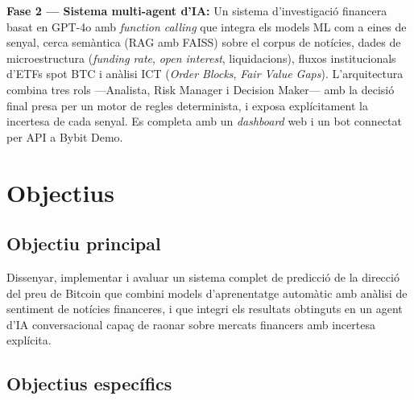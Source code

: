 \documentclass[12pt, a4paper]{report}
\begin{document}
\textbf{Fase 2 --- Sistema multi-agent d'IA:} Un sistema d'investigació financera basat en GPT-4o amb \textit{function calling} que integra els models ML com a eines de senyal, cerca semàntica (RAG amb FAISS) sobre el corpus de notícies, dades de microestructura (\textit{funding rate}, \textit{open interest}, liquidacions), fluxos institucionals d'ETFs spot BTC i anàlisi ICT (\textit{Order Blocks}, \textit{Fair Value Gaps}). L'arquitectura combina tres rols ---Analista, Risk Manager i Decision Maker--- amb la decisió final presa per un motor de regles determinista, i exposa explícitament la incertesa de cada senyal. Es completa amb un \textit{dashboard} web i un bot connectat per API a Bybit Demo.

\chapter{Objectius}

\section{Objectiu principal}

Dissenyar, implementar i avaluar un sistema complet de predicció de la direcció del preu de Bitcoin que combini models d'aprenentatge automàtic amb anàlisi de sentiment de notícies financeres, i que integri els resultats obtinguts en un agent d'IA conversacional capaç de raonar sobre mercats financers amb incertesa explícita.

\section{Objectius específics}
\end{document}
